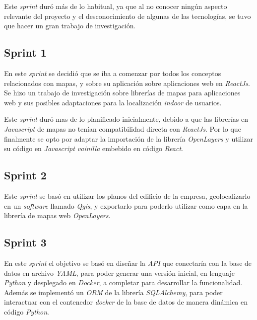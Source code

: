 Este \textit{sprint} duró más de lo habitual, ya que al no conocer ningún aspecto relevante del proyecto y el desconocimiento de algunas de las tecnologías, se tuvo que hacer un gran trabajo de investigación.

\subsection{Sprint 1}

En este \textit{sprint} se decidió que se iba a comenzar por todos los conceptos relacionados con mapas, y sobre su aplicación sobre aplicaciones web en \textit{ReactJs}. Se hizo un trabajo de investigación sobre librerías de mapas para aplicaciones web y sus posibles adaptaciones para la localización \textit{indoor} de usuarios.

Este \textit{sprint} duró mas de lo planificado inicialmente, debido a que las librerías en \textit{Javascript} de mapas no tenían compatibilidad directa con \textit{ReactJs}. Por lo que finalmente se opto por adaptar la importación de la librería \textit{OpenLayers} y utilizar su código en \textit{Javascript vainilla} embebido en código \textit{React}.

\subsection{Sprint 2}

Este \textit{sprint} se basó en utilizar los planos del edificio de la empresa, geolocalizarlo en un \textit{software} llamado \textit{Qgis}, y exportarlo para poderlo utilizar como capa en la librería de mapas web \textit{OpenLayers}.

\subsection{Sprint 3}

En este \textit{sprint} el objetivo se basó en diseñar la \textit{API} que conectaría con la base de datos en archivo \textit{YAML}, para poder generar una versión inicial, en lenguaje \textit{Python} y desplegado en \textit{Docker}, a completar para desarrollar la funcionalidad. Además se implementó un \textit{ORM} de la librería \textit{SQLAlchemy}, para poder interactuar con el contenedor \textit{docker} de la base de datos de manera dinámica en código \textit{Python}.

